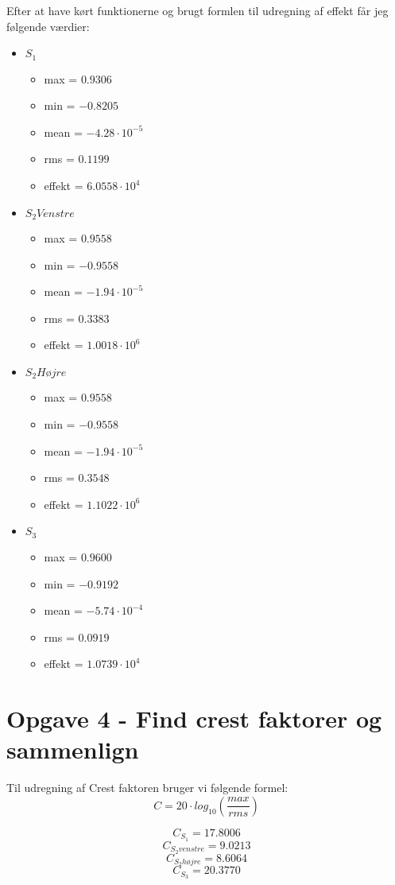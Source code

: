 \documentclass[../main.tex]{subfiles}
\begin{document}
Efter at have kørt funktionerne og brugt formlen til udregning af effekt får jeg følgende værdier:
\begin{itemize}
    \item $S_1$
    \begin{itemize}
        \item max = $0.9306$
        \item min = $-0.8205$
        \item mean = $-4.28 \cdot 10^{-5}$
        \item rms = $0.1199$
        \item effekt = $6.0558 \cdot 10^4$
    \end{itemize}
    \item $S_2Venstre$
    \begin{itemize}
        \item max = $0.9558$
        \item min = $-0.9558$
        \item mean = $-1.94 \cdot 10^{-5}$
        \item rms = $0.3383$
        \item effekt = $1.0018 \cdot 10^6$
    \end{itemize}
    \item $S_2Højre$
    \begin{itemize}
        \item max = $0.9558$
        \item min = $-0.9558$
        \item mean = $-1.94 \cdot 10^{-5}$
        \item rms = $0.3548$
        \item effekt = $1.1022 \cdot 10^6$
    \end{itemize}
    \item $S_3$
    \begin{itemize}
        \item max = $0.9600$
        \item min = $-0.9192$
        \item mean = $-5.74 \cdot 10^{-4}$
        \item rms = $0.0919$
        \item effekt = $1.0739 \cdot 10^4$
    \end{itemize}
\end{itemize}

\section{Opgave 4 - Find crest faktorer og sammenlign}

Til udregning af Crest faktoren bruger vi følgende formel:
\[
    C = 20 \cdot log_{10}(\frac{max}{rms})
\]

\[C_{S_1} = 17.8006\] 
\[C_{S_2venstre} = 9.0213\]
\[C_{S_2højre} = 8.6064\]
\[C_{S_3} = 20.3770\]
\end{document}
